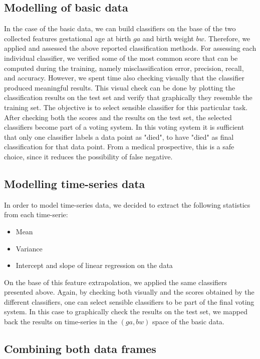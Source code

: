 \documentclass[a4paper,11pt]{article}
\begin{document}
\subsection{Modelling of basic data}
In the case of the basic data, we can build classifiers on the base of the two collected features gestational age at birth $ga$ and birth weight $bw$. Therefore, we applied and assessed the above reported classification methods. For assessing each individual classifier, we verified some of the most common score that can be computed during the training, namely misclassification error, precision, recall, and accuracy. However, we spent time also checking visually that the classifier produced meaningful results. This visual check can be done by plotting the classification results on the test set and verify that graphically they resemble the training set. The objective is to select sensible classifier for this particular task. After checking both the scores and the results on the test set, the selected classifiers become part of a voting system. In this voting system it is sufficient that only one classifier labels a data point as "died", to have "died" as final classification for that data point. From a medical prospective, this is a safe choice, since it reduces the possibility of false negative.

\subsection{Modelling time-series data}
In order to model time-series data, we decided to extract the following statistics from each time-serie:
\begin{itemize}
    \item Mean
    \item Variance
    \item Intercept and slope of linear regression on the data
\end{itemize}

On the base of this feature extrapolation, we applied the same classifiers presented above. Again, by checking both visually and the scores obtained by the different classifiers, one can select sensible classifiers to be part of the final voting system. In this case to graphically check the results on the test set, we mapped back the results on time-series in the $(ga, bw)$ space of the basic data.

\subsection{Combining both data frames}
\end{document}
